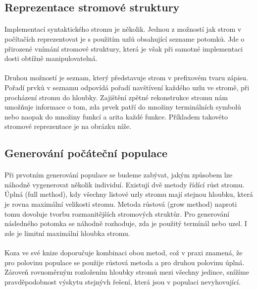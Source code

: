 \documentclass[bc,male,java,dept460]{diploma}		%
\begin{document}
\subsection{Reprezentace stromové struktury}
\paragraph*{}
Implementací syntaktického stromu je několik. Jednou z možností jak strom v počítačích reprezentovat je s použitím uzlů obsahující sezname potomků. Jde o přirozené vnímání stromové struktury, která je však při samotné implementaci dosti obtížně manipulovatelná. 

\paragraph*{}
Druhou možností je seznam, který představuje strom v prefixovém tvaru zápisu. Pořadí prvků v seznamu odpovídá pořadí navštívení každého uzlu ve stromě, při procházení stromu do hloubky. Zajištění zpětné rekonstrukce stromu nám umožňuje informace o tom, zda prvek patří do množiny terminálních symbolů nebo naopak do množiny funkcí a arita každé funkce. Příkladem takovéto stromové reprezentace je na obrázku níže.


\subsection{Generování počáteční populace}
\paragraph*{}
Při prvotním generování populace se budeme zabývat, jakým způsobem lze náhodně vygenerovat několik individuí. Existují dvě metody řídící růst stromu. Úplná (full method), kdy všechny listové uzly stromu mají stejnou hloubku, která je rovna maximální velikosti stromu. Metoda růstová (grow method) naproti tomu dovoluje tvorbu rozmanitějších stromových struktůr. Pro generování následného potomka se náhodně rozhoduje, zda je použitý termínál nebo uzel. I zde je limitní maximální hloubka stromu.

\paragraph*{}
Koza ve své knize \cite{kozagp} doporučuje kombinaci obou metod, což v praxi znamená, že pro polovinu populace se použije růstová metoda a pro druhou polovinu úplná. Zároveň rovnoměrným rozložením hloubky stromů mezi všechny jedince, snížíme pravděpodobnost výskytu stejnývh řešení, která jsou v populaci nevyhovující. 
\end{document}
